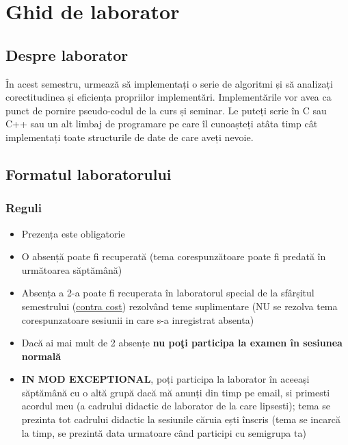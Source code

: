 \documentclass[../en-fa-lab.tex]{subfiles}
\begin{document}
\section{\texorpdfstring{\textbf{Ghid de laborator}}{Ghid de laborator}}\label{ghid}

\subsection{Despre laborator}\label{despre-laborator}

În acest semestru, urmează să implementați o serie de algoritmi și să
analizați corectitudinea și eficiența propriilor implementări.
Implementările vor avea ca punct de pornire pseudo-codul de la curs și
seminar. Le puteți scrie în C sau C++ sau un alt limbaj de programare pe
care îl cunoașteți atâta timp cât implementați toate structurile de date
de care aveți nevoie.

\subsection{Formatul laboratorului}\label{formatul-laboratorului}

\subsubsection{Reguli}\label{reguli}

\begin{itemize}
\item
  Prezența este obligatorie
\item
  O absență poate fi recuperată (tema corespunzătoare poate fi predată
  în următoarea săptămână)
\item
  Absența a 2-a poate fi recuperata în laboratorul special de la
  sfârșitul semestrului
  (\href{http://ac.utcluj.ro/regulamente.html?file=files/regulamente_studenti/Taxe_2015-2016.pdf}{\ul{contra cost}}) rezolvând teme suplimentare (NU se rezolva tema
  corespunzatoare sesiunii in care s-a inregistrat absenta)
\item
  Dacă ai mai mult de 2 absențe \textbf{nu poţi participa la examen în
  sesiunea normală}
\item
  \textbf{IN MOD EXCEPTIONAL}, poți participa la laborator în aceeași
  săptămână cu o altă grupă dacă mă anunți din timp pe email, si
  primesti acordul meu (a cadrului didactic de laborator de la care
  lipsesti); tema se prezinta tot cadrului didactic la sesiunile căruia
  ești înscris (tema se incarcă la timp, se prezintă data urmatoare când
  participi cu semigrupa ta)
\end{itemize}
\end{document}
